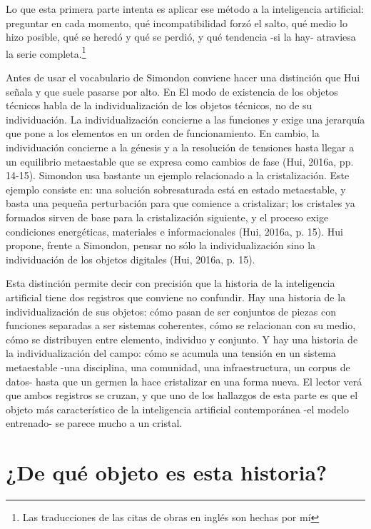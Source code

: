 Lo que esta primera parte intenta es aplicar ese método a la inteligencia artificial: preguntar en cada momento, qué incompatibilidad forzó el salto, qué medio lo hizo posible, qué se heredó y qué se perdió, y qué tendencia -si la hay- atraviesa la serie completa.\footnote{Las traducciones de las citas de obras en inglés son hechas por mí}

Antes de usar el vocabulario de Simondon conviene hacer una distinción que Hui señala y que suele pasarse por alto. En El modo de existencia de los objetos técnicos habla de la individualización de los objetos técnicos, no de su individuación. La individualización concierne a las funciones y exige una jerarquía que pone a los elementos en un orden de funcionamiento. En cambio, la individuación concierne a la génesis y a la resolución de tensiones hasta llegar a un equilibrio metaestable que se expresa como cambios de fase (Hui, 2016a, pp. 14-15). Simondon usa bastante un ejemplo relacionado a la cristalización. Este ejemplo consiste en: una solución sobresaturada está en estado metaestable, y basta una pequeña perturbación para que comience a cristalizar; los cristales ya formados sirven de base para la cristalización siguiente, y el proceso exige condiciones energéticas, materiales e informacionales (Hui, 2016a, p. 15). Hui propone, frente a Simondon, pensar no sólo la individualización sino la individuación de los objetos digitales (Hui, 2016a, p. 15).

Esta distinción permite decir con precisión que la historia de la inteligencia artificial tiene dos registros que conviene no confundir. Hay una historia de la individualización de sus objetos: cómo pasan de ser conjuntos de piezas con funciones separadas a ser sistemas coherentes, cómo se relacionan con su medio, cómo se distribuyen entre elemento, individuo y conjunto. Y hay una historia de la individualización del campo: cómo se acumula una tensión en un sistema metaestable -una disciplina, una comunidad, una infraestructura, un corpus de datos- hasta que un germen la hace cristalizar en una forma nueva. El lector verá que ambos registros se cruzan, y que uno de los hallazgos de esta parte es que el objeto más característico de la inteligencia artificial contemporánea -el modelo entrenado- se parece mucho a un cristal.

\section*{¿De qué objeto es esta historia?}

